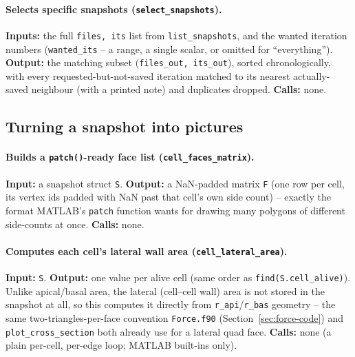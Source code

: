 \documentclass[11pt,a4paper]{report}
\begin{document}
\paragraph{Selects specific snapshots (\texttt{select\_snapshots}).}
\textbf{Inputs:} the full \texttt{files, its} list from
\texttt{list\_snapshots}, and the wanted iteration numbers
(\texttt{wanted\_its} -- a range, a single scalar, or omitted for
``everything''). \textbf{Output:} the matching subset
(\texttt{files\_out, its\_out}), sorted chronologically, with every
requested-but-not-saved iteration matched to its nearest actually-saved
neighbour (with a printed note) and duplicates dropped. \textbf{Calls:}
none.

\subsection{Turning a snapshot into pictures}
\paragraph{Builds a \texttt{patch()}-ready face list
(\texttt{cell\_faces\_matrix}).} \textbf{Input:} a snapshot struct
\texttt{S}. \textbf{Output:} a NaN-padded matrix \texttt{F} (one row
per cell, its vertex ids padded with NaN past that cell's own side
count) -- exactly the format MATLAB's \texttt{patch} function wants for
drawing many polygons of different side-counts at once. \textbf{Calls:}
none.
\paragraph{Computes each cell's lateral wall area
(\texttt{cell\_lateral\_area}).} \textbf{Input:} \texttt{S}.
\textbf{Output:} one value per alive cell (same order as
\texttt{find(S.cell\_alive)}). Unlike apical/basal area, the lateral
(cell--cell wall) area is not stored in the snapshot at all, so this
computes it directly from \texttt{r\_api}/\texttt{r\_bas} geometry --
the same two-triangles-per-face convention
\texttt{Force.f90} (Section~\ref{sec:force-code}) and
\texttt{plot\_cross\_section} both already use for a lateral quad face.
\textbf{Calls:} none (a plain per-cell, per-edge loop; MATLAB
built-ins only).
\end{document}
